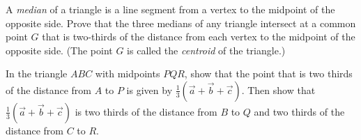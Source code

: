 
\begin{Exercise}[
name={},
title={}, 
difficulty=0,
origin={\cite{SM}}]
A \emph{median} of a triangle is a line segment from a vertex to the midpoint of the opposite side. Prove that the three medians of any triangle intersect at a common point $G$ that is two-thirds of the distance from each vertex to the midpoint of the opposite side. (The point $G$ is called the \emph{centroid} of the triangle.)
\end{Exercise}

\begin{Answer}
In the triangle $ABC$ with midpoints $PQR$, show that the point that is two thirds of the distance from $A$ to $P$ is given by $\frac{1}{3}(\vec{a}+\vec{b}+\vec{c})$. Then show that $\frac{1}{3}(\vec{a}+\vec{b}+\vec{c})$ is two thirds of the distance from $B$ to $Q$ and two thirds of the distance from $C$ to $R$.
\end{Answer}
